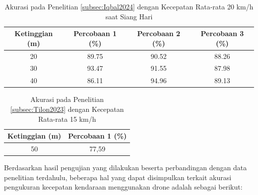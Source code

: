 \begin{table}[H]
\centering
\caption{Akurasi pada Penelitian \ref{subsec:Iqbal2024} dengan Kecepatan Rata-rata 20 km/h saat Siang Hari}
\label{table:accuracy_iqbal}
\begin{tabular}{|c|c|c|c|}
\hline
\textbf{Ketinggian (m)} & \textbf{Percobaan 1 (\%)} & \textbf{Percobaan 2 (\%)} & \textbf{Percobaan 3 (\%)} \\ \hline
20 & 89.75 & 90.52 & 88.26 \\
30 & 93.47 & 91.55 & 87.98 \\
40 & 86.11 & 94.96 & 89.13 \\ \hline
\end{tabular}
\end{table}

\begin{table}[H]
\centering
\caption{Akurasi pada Penelitian \ref{subsec:Tilon2023} dengan Kecepatan Rata-rata 15 km/h}
\label{table:accuracy_tilon}
\begin{tabular}{|c|c|}
\hline
\textbf{Ketinggian (m)} & \textbf{Percobaan 1 (\%)} \\ \hline
50 & 77,59 \\ \hline
\end{tabular}
\end{table}

Berdasarkan hasil pengujian yang dilakukan beserta perbandingan dengan data penelitian terdahulu, beberapa hal yang dapat disimpulkan terkait akurasi pengukuran kecepatan kendaraan menggunakan drone adalah sebagai berikut:

